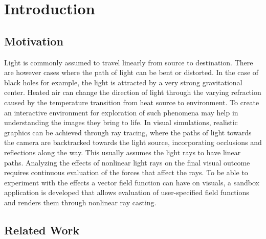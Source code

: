 \chapter{Introduction}

\section{Motivation}

Light is commonly assumed to travel linearly from source to destination.
There are however cases where the path of light can be bent or distorted.
In the case of black holes for example, the light is attracted by a very strong gravitational center.
Heated air can change the direction of light through the varying refraction caused by the temperature transition from heat source to environment.
To create an interactive environment for exploration of such phenomena may help in understanding the images they bring to life.
In visual simulations, realistic graphics can be achieved through ray tracing, where the paths of light towards the camera are backtracked towards the light source, incorporating occlusions and reflections along the way.
This usually assumes the light rays to have linear paths.
Analyzing the effects of nonlinear light rays on the final visual outcome requires continuous evaluation of the forces that affect the rays.
To be able to experiment with the effects a vector field function can have on visuals, a sandbox application is developed that allows evaluation of user-specified field functions and renders them through nonlinear ray casting.

\section{Related Work}

